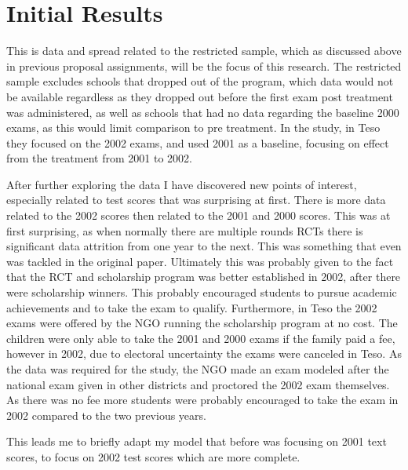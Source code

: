 \documentclass{article}
\begin{document}
\newpage
\section{Initial Results}

\begin{table}[H] %
  \centering
  \caption{Summary statistics}
  \label{tab:summary}
\end{table}

This is data and spread related to the restricted sample, which as discussed above in previous proposal assignments, will be the focus of this research. The restricted sample excludes schools that dropped out of the program, which data would not be available regardless as they dropped out before the first exam post treatment was administered, as well as schools that had no data regarding the baseline 2000 exams, as this would limit comparison to pre treatment. In the study, in Teso they focused on the 2002 exams, and used 2001 as a baseline, focusing on effect from the treatment from 2001 to 2002.\autocites{kremer-miguel-thornton-2004}

After further exploring the data I have discovered new points of interest, especially related to test scores that was surprising at first. There is more data related to the 2002 scores then related to the 2001 and 2000 scores. This was at first surprising, as when normally there are multiple rounds RCTs there is significant data attrition from one year to the next. This was something that even was tackled in the original paper. \autocites{kremer-miguel-thornton-2004} Ultimately this was probably given to the fact that the RCT and scholarship program was better established in 2002, after there were scholarship winners. This probably encouraged students to pursue academic achievements and to take the exam to qualify. Furthermore, in Teso the 2002 exams were offered by the NGO running the scholarship program at no cost. The children were only able to take the 2001 and 2000 exams if the family paid a fee, however in 2002, due to electoral uncertainty the exams were canceled in Teso. As the data was required for the study, the NGO made an exam modeled after the national exam given in other districts and proctored the 2002 exam themselves. As there was no fee more students were probably encouraged to take the exam in 2002 compared to the two previous years. 

This leads me to briefly adapt my model that before was focusing on 2001 text scores, to focus on 2002 test scores which are more complete. 
\end{document}
